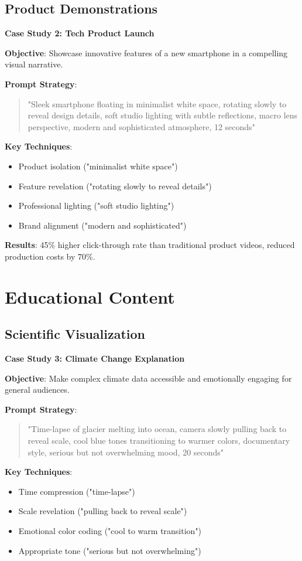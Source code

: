 \subsection{Product Demonstrations}
\textbf{Case Study 2: Tech Product Launch}

\textbf{Objective}: Showcase innovative features of a new smartphone in a compelling visual narrative.

\textbf{Prompt Strategy}:
\begin{quote}
"Sleek smartphone floating in minimalist white space, rotating slowly to reveal design details, soft studio lighting with subtle reflections, macro lens perspective, modern and sophisticated atmosphere, 12 seconds"
\end{quote}

\textbf{Key Techniques}:
\begin{itemize}
\item Product isolation ("minimalist white space")
\item Feature revelation ("rotating slowly to reveal details")
\item Professional lighting ("soft studio lighting")
\item Brand alignment ("modern and sophisticated")
\end{itemize}

\textbf{Results}: 45\% higher click-through rate than traditional product videos, reduced production costs by 70\%.

\section{Educational Content}

\subsection{Scientific Visualization}
\textbf{Case Study 3: Climate Change Explanation}

\textbf{Objective}: Make complex climate data accessible and emotionally engaging for general audiences.

\textbf{Prompt Strategy}:
\begin{quote}
"Time-lapse of glacier melting into ocean, camera slowly pulling back to reveal scale, cool blue tones transitioning to warmer colors, documentary style, serious but not overwhelming mood, 20 seconds"
\end{quote}

\textbf{Key Techniques}:
\begin{itemize}
\item Time compression ("time-lapse")
\item Scale revelation ("pulling back to reveal scale")
\item Emotional color coding ("cool to warm transition")
\item Appropriate tone ("serious but not overwhelming")
\end{itemize}


